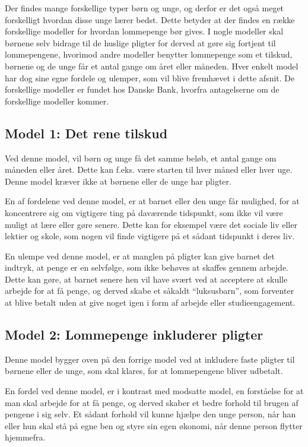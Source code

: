 Der findes mange forskellige typer børn og unge, 
og derfor er det også meget forskelligt hvordan 
disse unge lærer bedst. Dette betyder at 
der findes en række forskellige modeller for 
hvordan lommepenge bør gives. I nogle modeller 
skal børnene selv bidrage til de huslige pligter 
for derved at gøre sig fortjent til 
lommepengene, hvorimod andre modeller benytter 
lommepenge som et tilskud, børnene og de unge 
får et antal gange om året eller måneden. Hver 
enkelt model har dog sine egne fordele og 
ulemper, som vil blive fremhævet i dette afsnit. 
De forskellige modeller er fundet hos Danske 
Bank, hvorfra antagelserne om de forskellige 
modeller kommer\cite{DanskeB2}\cite{DanskeB3}.

\subsection{Model 1: Det rene tilskud}
Ved denne model, vil børn og unge få det samme 
beløb, et antal gange om måneden eller året. 
Dette kan f.eks. være starten til hver måned 
eller hver uge. Denne model kræver ikke 
at børnene eller de unge har pligter.

En af fordelene ved denne model, er at barnet 
eller den unge får mulighed, for at koncentrere 
sig om vigtigere ting på daværende tidspunkt, 
som ikke vil være muligt at lære eller gøre 
senere. Dette kan for eksempel være det sociale 
liv eller lektier og skole, som nogen vil finde 
vigtigere på et sådant tidspunkt i deres liv.

En ulempe ved denne model, er at manglen på 
pligter kan give barnet det indtryk, at penge er 
en selvfølge, som ikke behøves at skaffes gennem 
arbejde. Dette kan gøre, at barnet senere hen 
vil have svært ved at acceptere at skulle 
arbejde for at få penge, og derved skabe et 
såkaldt “luksusbarn”, som forventer at blive 
betalt uden at give noget igen i form af 
arbejde eller studieengagement.

\subsection{Model 2: Lommepenge inkluderer 
pligter}
Denne model bygger oven på den forrige model ved 
at inkludere faste pligter til børnene eller de 
unge, som skal klares, for at lommepengene 
bliver udbetalt.

En fordel ved denne model, er i kontrast med 
modsatte model, en forståelse for at man skal 
arbejde for at få penge, og derved skaber et 
bedre forhold til brugen af pengene i sig selv. 
Et sådant forhold vil kunne hjælpe den unge 
person, når han eller hun skal stå på egne ben 
og styre sin egen økonomi, når denne person 
flytter hjemmefra.

